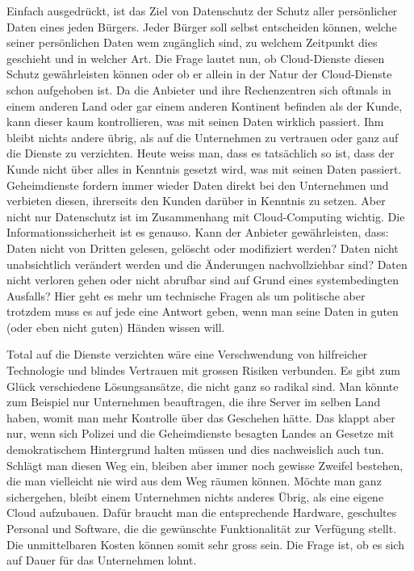   Einfach ausgedrückt, ist das Ziel von Datenschutz der Schutz aller persönlicher Daten eines jeden Bürgers. Jeder Bürger soll selbst entscheiden können, welche seiner persönlichen Daten wem zugänglich sind, zu welchem Zeitpunkt dies geschieht und in welcher Art. Die Frage lautet nun, ob Cloud-Dienste diesen Schutz gewährleisten können oder ob er allein in der Natur der Cloud-Dienste schon aufgehoben ist. Da die Anbieter und ihre Rechenzentren sich oftmals in einem anderen Land oder gar einem anderen Kontinent befinden als der Kunde, kann dieser kaum kontrollieren, was mit seinen Daten wirklich passiert. Ihm bleibt nichts andere übrig, als auf die Unternehmen zu vertrauen oder ganz auf die Dienste zu verzichten. Heute weiss man, dass es tatsächlich so ist, dass der Kunde nicht über alles in Kenntnis gesetzt wird, was mit seinen Daten passiert. Geheimdienste fordern immer wieder Daten direkt bei den Unternehmen und verbieten diesen, ihrerseits den Kunden darüber in Kenntnis zu setzen. Aber nicht nur Datenschutz ist im Zusammenhang mit Cloud-Computing wichtig. Die Informationssicherheit ist es genauso.
  Kann der Anbieter gewährleisten, dass:
  Daten nicht von Dritten gelesen, gelöscht oder modifiziert werden?
  Daten nicht unabsichtlich verändert werden und die Änderungen nachvollziehbar sind?
  Daten nicht verloren gehen oder nicht abrufbar sind auf Grund eines systembedingten Ausfalls?
  Hier geht es mehr um technische Fragen als um politische aber trotzdem muss es auf jede eine Antwort geben, wenn man seine Daten in guten (oder eben nicht guten) Händen wissen will.

  Total auf die Dienste verzichten wäre eine Verschwendung von hilfreicher Technologie und blindes Vertrauen mit grossen Risiken verbunden. Es gibt zum Glück verschiedene Lösungsansätze, die nicht ganz so radikal sind. Man könnte zum Beispiel nur Unternehmen beauftragen, die ihre Server im selben Land haben, womit man mehr Kontrolle über das Geschehen hätte. Das klappt aber nur, wenn sich Polizei und die Geheimdienste besagten Landes an Gesetze mit demokratischem Hintergrund halten müssen und dies nachweislich auch tun. Schlägt man diesen Weg ein, bleiben aber immer noch gewisse Zweifel bestehen, die man vielleicht nie wird aus dem Weg räumen können. Möchte man ganz sichergehen, bleibt einem Unternehmen nichts anderes Übrig, als eine eigene Cloud aufzubauen. Dafür braucht man die entsprechende Hardware, geschultes Personal und   Software, die die gewünschte Funktionalität zur Verfügung stellt. Die unmittelbaren Kosten können somit sehr gross sein. Die Frage ist, ob es sich auf Dauer für das Unternehmen lohnt.

